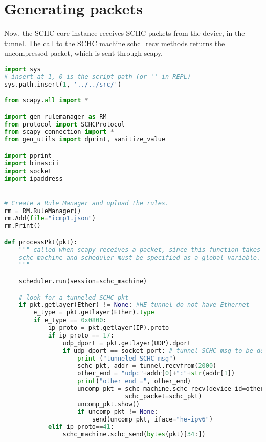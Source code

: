 \section{Generating packets}

Now, the SCHC core instance receives SCHC packets from the device, in the tunnel. 
The call to the SCHC machine schc\_recv methods returns the uncompressed packet, which is sent through scapy.

\begin{lstlisting}[language=Python, caption={Program ping\_core2.py}, label=prog-ping-core2, basicstyle=\ttfamily\scriptsize]
import sys
# insert at 1, 0 is the script path (or '' in REPL)
sys.path.insert(1, '../../src/')

from scapy.all import *

import gen_rulemanager as RM
from protocol import SCHCProtocol
from scapy_connection import *
from gen_utils import dprint, sanitize_value

import pprint
import binascii
import socket
import ipaddress


# Create a Rule Manager and upload the rules.
rm = RM.RuleManager()
rm.Add(file="icmp1.json")
rm.Print()

def processPkt(pkt):
    """ called when scapy receives a packet, since this function takes only one argument,
    schc_machine and scheduler must be specified as a global variable.
    """

    scheduler.run(session=schc_machine)

    # look for a tunneled SCHC pkt
    if pkt.getlayer(Ether) != None: #HE tunnel do not have Ethernet
        e_type = pkt.getlayer(Ether).type
        if e_type == 0x0800:
            ip_proto = pkt.getlayer(IP).proto
            if ip_proto == 17:
                udp_dport = pkt.getlayer(UDP).dport
                if udp_dport == socket_port: # tunnel SCHC msg to be decompressed
                    print ("tunneled SCHC msg")                    
                    schc_pkt, addr = tunnel.recvfrom(2000)
                    other_end = "udp:"+addr[0]+":"+str(addr[1])
                    print("other end =", other_end)
                    uncomp_pkt = schc_machine.schc_recv(device_id=other_end,
                                 schc_packet=schc_pkt)
                    uncomp_pkt.show()
                    if uncomp_pkt != None:
                        send(uncomp_pkt, iface="he-ipv6")
            elif ip_proto==41:
                schc_machine.schc_send(bytes(pkt)[34:])


\end{lstlisting}

